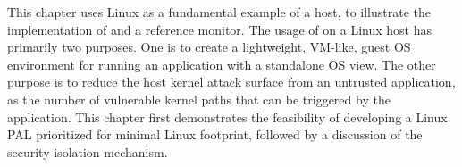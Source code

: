 This chapter uses Linux as a fundamental example
of a \graphene{} host, to illustrate the implementation of \thehostabi{}
and a reference monitor.
The usage of \graphene{} on a Linux host
has primarily two purposes.
One is to create a lightweight, VM-like, guest OS environment for running an application
with a standalone OS view.
The other purpose is
to reduce the host kernel attack surface from an untrusted application,
as the number of vulnerable kernel paths that can be triggered by the application.
This chapter first demonstrates the feasibility of developing a Linux PAL prioritized for minimal Linux \linuxapi{} footprint,
followed by a discussion of the security isolation mechanism.


